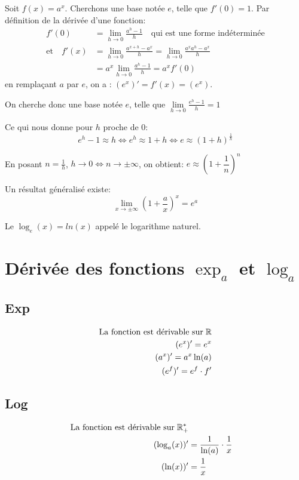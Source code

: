 \documentclass[12pt,a4paper]{report}
\begin{document}
	Soit $f(x) = a^x$. Cherchons une base notée $e$, telle que $f'(0)=1$. Par définition de la dérivée d'une fonction: 
	\begin{align*}
		f'(0) & = \lim\limits_{h \rightarrow 0} \frac{a^h-1}{h} \quad \text{qui est une forme indéterminée} \\
		\text{et} \quad f'(x) & = \lim\limits_{h\rightarrow 0}\frac{a^{x+h}-a^x}{h}= \lim\limits_{h\rightarrow 0} \frac{a^xa^h-a^x}{h} \\
		&= a^x \lim\limits_{h \rightarrow 0} \frac{a^h-1}{h} = a^xf'(0)
	\end{align*}
	en remplaçant $a$ par $e$, on a : $(e^x)' =f'(x)=(e^x)$.
	
	\medskip
	On cherche donc une base notée $e$, telle que \hspace{0.5cm} $\lim\limits_{h \rightarrow 0} \frac{e^h-1}{h}=1$
	
	\medskip
	Ce qui nous donne pour $h$ proche de 0: \[ e^h-1\approx h \Leftrightarrow e^h \approx 1+h \Leftrightarrow e \approx (1+h)^{\frac{1}{h}} \]
	
	\medskip
	En posant $n=\frac{1}{h}$, $h \rightarrow 0 \Leftrightarrow n \rightarrow \pm \infty$, on obtient: \hspace{0.4cm} $e \approx \left(1+\dfrac{1}{n}\right)^n$
	
	Un résultat généralisé existe: \[\lim\limits_{x \rightarrow \pm \infty} \left(1+\dfrac{a}{x}\right)^x=e^a \]
	
	\medskip
	Le $\log_{e}(x) = ln(x)$ appelé le logarithme naturel.
	\section*{Dérivée des fonctions $\exp_{a}$ et $\log_{a}$ }
	\subsection*{Exp}
	\begin{align*}
	\text{La fonction est dérivable sur} \hspace{0.1cm} \mathbb{R} \\
	(e^x)' = e^x \\
	(a^x)' = a^x\ln(a) \\
	(e^f)' = e^f\cdot f'
	\end{align*}
	\subsection*{Log}
	\begin{align*}
	\text{La fonction est dérivable sur} \hspace{0.1cm} \mathbb{R}^{*}_{+} \\
	(\log_{a}(x))' &= \frac{1}{\ln(a)}\cdot\frac{1}{x} \\
	(\ln(x))' &= \frac{1}{x}
	\end{align*}
\end{document}
